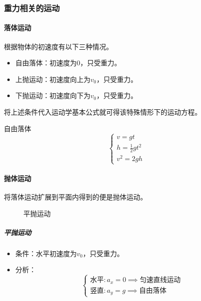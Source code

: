 \subsubsection{重力相关的运动}

\paragraph{落体运动}根据物体的初速度有以下三种情况。
\begin{itemize}
    \item 自由落体：初速度为0，只受重力。
    \item 上抛运动：初速度向上为$v_0$，只受重力。
    \item 下抛运动：初速度向下为$v_0$，只受重力。
\end{itemize}
将上述条件代入运动学基本公式就可得该特殊情形下的运动方程。
\begin{itembox}[l]{自由落体}
    \begin{equation*}
        \begin{cases}
            v=gt\\
            h=\frac{1}{2}gt^2\\
            v^2=2gh
        \end{cases}
    \end{equation*}
\end{itembox}

\paragraph{抛体运动}将落体运动扩展到平面内得到的便是抛体运动。
\begin{figure}[ht!]
    \centering
    \caption{平抛运动}
\end{figure}
\subparagraph{平抛运动}
\begin{itemize}
    \item 条件：水平初速度为$v_0$，只受重力。
    \item 分析：
    \begin{equation*}
        \begin{cases}
            \textrm{水平}:a_x=0\implies\textrm{匀速直线运动}\\
            \textrm{竖直}:a_y=g\implies\textrm{自由落体}
        \end{cases}
    \end{equation*}
\end{itemize}

